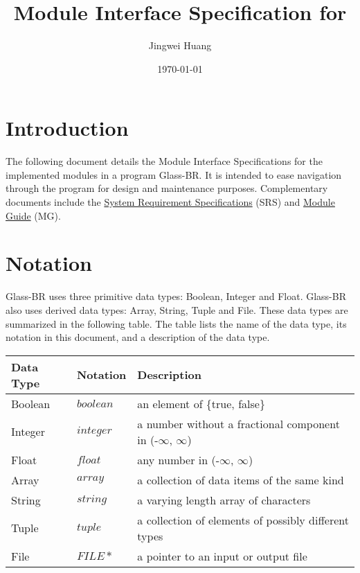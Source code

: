 \documentclass[12pt]{article}
\newcommand{\progname}[1]{Glass-BR}
\begin{document}
\title{Module Interface Specification for \progname} 
\author{Jingwei Huang}
\date{\today}

\maketitle

\tableofcontents

\newpage

\section{Introduction}

The following document details the Module Interface
Specifications for the implemented modules in a program \progname{}. It is
intended to ease navigation through the program for design and
maintenance purposes.  Complementary documents include the 
\href{../SRS/glassbr_srs.pdf}{System Requirement Specifications} (SRS) and 
\href{../MG/glassbr_mg.pdf}{Module Guide} (MG).

\section{Notation}

\progname{} uses three primitive data types: Boolean, Integer and Float. 
\progname{} also uses derived data types: Array, String, Tuple and File.
These data types are summarized in the following table. The table lists the name of the data type, 
its notation in this document, and a description of the data type.
\newline

\noindent \begin{tabular}{l l p{}} \hline
\textbf{Data Type} & \textbf{Notation} & \textbf{Description}\\ \hline
Boolean & $boolean$ & an element of \{true, false\}\\ \hline
Integer & $integer$ & a number without a fractional component in (-$\infty$, $\infty$)\\ \hline
Float & $float$ & any number in (-$\infty$, $\infty$) \\ \hline
Array & $array$ & a collection of data items of the same kind \\ \hline
String & $string$ & a varying length array of characters \\ \hline
Tuple & $tuple$ & a collection of elements of possibly different types \\ \hline
File & $FILE{}\ast$ & a pointer to an input or output file \\ \hline
\end{tabular} 
\end{document}
